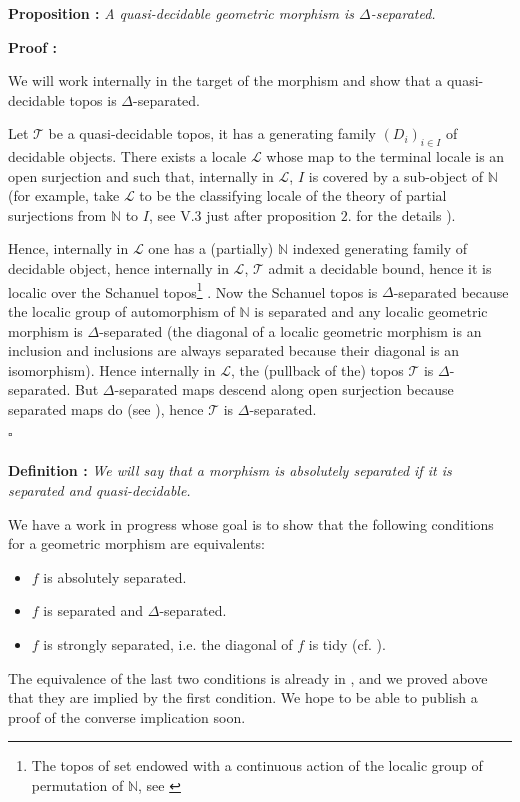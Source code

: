 \documentclass[a4paper]{article}
\newcommand{\N}{\mathbb{N}}
\newcommand{\Tcal}{\mathcal{T}}
\newcommand{\Lcal}{\mathcal{L}}
\newcommand{\block}[1]
{

\par \subsubsection{} #1

\bigskip}
\newcommand{\Prop}[1]
	{

	\bigskip
	
	\textbf{Proposition : }{\itshape #1}
		
	\bigskip
	
	}
\newcommand{\Def}[1]
	{
	
	\bigskip
	
	\textbf{Definition : }{\itshape #1}
	
	\bigskip
	
	}
\newcommand{\Dem}[1]{
	
	\smallskip
	
	\textbf{Proof : } \par
	 {#1} $\square$
	 
	 \bigskip
}
\begin{document}
\block{\label{P_quasiDecImpDeltaSep}\Prop{A quasi-decidable geometric morphism is $\Delta$-separated.}

\Dem{We will work internally in the target of the morphism and show that a quasi-decidable topos is $\Delta$-separated.

Let $\Tcal$ be a quasi-decidable topos, it has a generating family $(D_i)_{i \in I}$ of decidable objects. There exists a locale $\Lcal$ whose map to the terminal locale is an open surjection and such that, internally in $\Lcal$, $I$ is covered by a sub-object of $\N$ (for example, take $\Lcal$ to be the classifying locale of the theory of partial surjections from $\mathbb{N}$ to $I$, see \cite{joyal1984extension} V.3 just after proposition $2.$ for the details ).

Hence, internally in $\Lcal$ one has a (partially) $\N$ indexed generating family of decidable object, hence internally in $\Lcal$, $\Tcal$ admit a decidable bound, hence it is localic over the Schanuel topos\footnote{The topos of set endowed with a continuous action of the localic group of permutation of $\mathbb{N}$, see \cite[C5.4.4]{sketches} } . Now the Schanuel topos is $\Delta$-separated because the localic group of automorphism of $\N$ is separated and any localic geometric morphism is $\Delta$-separated (the diagonal of a localic geometric morphism is an inclusion and inclusions are always separated because their diagonal is an isomorphism). Hence internally in $\Lcal$, the (pullback of the) topos $\Tcal$ is $\Delta$-separated. But $\Delta$-separated maps descend along open surjection because separated maps do (see \cite[C5.1.7]{sketches}), hence $\Tcal$ is $\Delta$-separated.
}

}



\block{\Def{We will say that a morphism is absolutely separated if it is separated and quasi-decidable.}

We have a work in progress whose goal is to show that the following conditions for a geometric morphism are equivalents:

\begin{itemize}

\item $f$ is absolutely separated.

\item $f$ is separated and $\Delta$-separated.

\item $f$ is strongly separated, i.e. the diagonal of $f$ is tidy (cf. \cite{moerdijk2000proper}).

\end{itemize}

The equivalence of the last two conditions is already in \cite{moerdijk2000proper}, and we proved above that they are implied by the first condition. We hope to be able to publish a proof of the converse implication soon.

}
\end{document}
